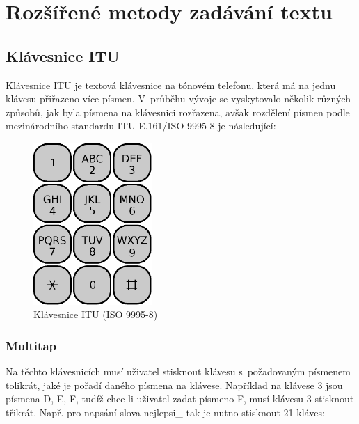 \documentclass[a4paper,11pt,openany]{book} %
\newcommand\exmp{\textsf}
\begin{document}
\chapter{Rozšířené metody zadávání textu}\label{input-methods}

\section{Klávesnice ITU}\label{itu-kb}

Klávesnice ITU je textová klávesnice na tónovém telefonu, která má na jednu klávesu přiřazeno více písmen. V~průběhu vývoje se vyskytovalo několik různých způsobů, jak byla písmena na klávesnici rozřazena, avšak rozdělení písmen podle mezinárodního standardu ITU E.161/ISO 9995-8 je následující: %

\begin{figure}[h]
	\centering
	\includegraphics[width=0.4\textwidth]{telephone-keypad.eps}
	\caption{Klávesnice ITU (ISO 9995-8)\protect\footnotemark}
	\label{fig:phoneKeyboard}
\end{figure}


\subsection{Multitap}

Na těchto klávesnicích musí uživatel stisknout klávesu s~požadovaným písmenem tolikrát, jaké je pořadí daného písmena na klávese. Například na klávese \exmp{3} jsou písmena \exmp{D}, \exmp{E}, \exmp{F}, tudíž chce-li uživatel zadat písmeno \exmp{F}, musí klávesu \exmp{3} stisknout třikrát. Např. pro napsání slova \exmp{nejlepsi\_} tak je nutno stisknout 21 kláves:
\end{document}
